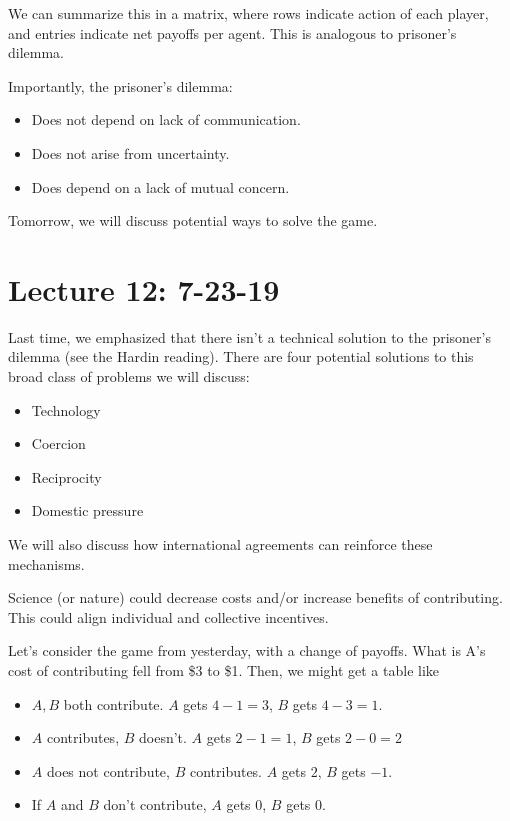 \documentclass{article}
\begin{document}
  We can summarize this in a matrix, where rows indicate action of each player, and entries indicate net payoffs per agent.  This is analogous to prisoner's dilemma.

  Importantly, the prisoner's dilemma:
  \begin{itemize}
    \item Does not depend on lack of communication.
    \item Does not arise from uncertainty.
    \item Does depend on a lack of mutual concern.
  \end{itemize}

  Tomorrow, we will discuss potential ways to solve the game.

  \section{Lecture 12: 7-23-19}

  Last time, we emphasized that there isn't a technical solution to the prisoner's dilemma (see the Hardin reading).  There are four potential solutions to this broad class of problems we will discuss:
  \begin{itemize}
    \item Technology
    \item Coercion
    \item Reciprocity
    \item Domestic pressure
  \end{itemize}

  We will also discuss how international agreements can reinforce these mechanisms.

  Science (or nature) could decrease costs and/or increase benefits of contributing.  This could align individual and collective incentives.

  Let's consider the game from yesterday, with a change of payoffs.  What is A's cost of contributing fell from \$3 to \$1.  Then, we might get a table like

  \begin{itemize}
    \item $A, B$ both contribute.  $A$ gets $4-1 = 3$, $B$ gets $4-3 = 1$.
    \item $A$ contributes, $B$ doesn't. $A$ gets $2-1 = 1$, $B$ gets $2-0 = 2$
    \item $A$ does not contribute, $B$ contributes.  $A$ gets $2$, $B$ gets $-1$.
    \item If $A$ and $B$ don't contribute, $A$ gets 0, $B$ gets 0.
  \end{itemize}
\end{document}
